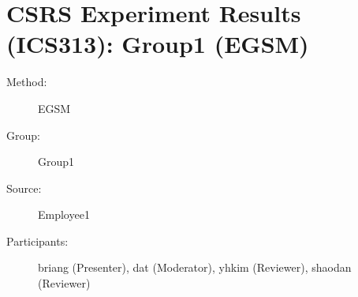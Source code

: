 
%          
	  
\chapter {CSRS Experiment Results (ICS313): Group1 (EGSM)}
\small
 
\begin{description}
\item [Method:] EGSM
\item [Group:] Group1
\item [Source:] Employee1
\item [Participants:] briang (Presenter), dat (Moderator), yhkim (Reviewer), shaodan (Reviewer)
\end{description}
